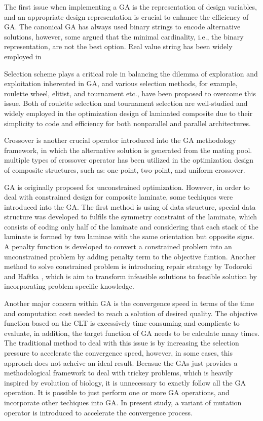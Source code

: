 The first issue when implementing a GA is the representation of design
variables, and an appropriate design representation is crucial to enhance the
efficiency of GA. The canonical GA has always used binary strings to encode
alternative solutions, however, some argued that the minimal cardinality, i.e.,
the binary representation, are not the best option. Real value string has been
widely employed in 

Selection scheme plays a critical role in balancing the dilemma of exploration
and exploitation inherented in GA, and various selection methods, for example,
roulette wheel, elitist, and tournament etc., have been proposed to overcome
this issue. Both of roulette selection and tournament selection are well-studied
and widely employed in the optimization design of laminated composite due to
their simplicity to code and efficiency for both nonparallel and parallel
architectures.

Crossover is another crucial operator introduced into the GA
methodology framework, in which the alternative solution is generated from the
mating pool.  multiple types of crossover operator has been utilized in the optimization
design of composite structures, such as: one-point, two-point, and uniform
crossover.


GA is originally proposed for unconstrained optimization. However, in order to
deal with constrained design for composite laminate, some techiques were
introduced into the GA. The first method is using of data structure, special
data structure was developed to fulfils the symmetry constraint of the laminate,
which consists of coding only half of the laminate and considering that each
stack of the laminate is formed by two laminae with the same orientation but
opposite signs\cite{le1995improved,kogiso1994design}. A penalty function is
developed to convert a constrained problem into an unconstrained problem by
adding penalty term to the objective funtion. Another method to solve
constrained problem is introducing repair strategy by Todoroki and Haftka
\cite{todoroki1998stacking}, which is aim to transform infeasible solutions to
feasible solution by incorporating problem-specific knowledge. 

Another major concern within GA is the convergence speed in terms of the time
and computation cost needed to reach a solution of desired quality. The
objective function based on the CLT is excessively time-consuming and complicate
to evaluate, in addition, the target function of GA  needs to be calculate many
times. The traditional method to deal with this issue is by increasing the
selection pressure to accelerate the convergence speed, however, in some cases,
this approach does not acheive an ideal result. Becasue the GAs just provides a
methodological framework to deal with trickey problems, which is heavily
inspired by evolution of biology, it is unnecessary to exactly follow all the
GA operation. It is possible to just perform one or more GA operations, and
incorporate other techiques into GA. In present study, a variant of mutation
operator is introduced to accelerate the convergence process.
  


